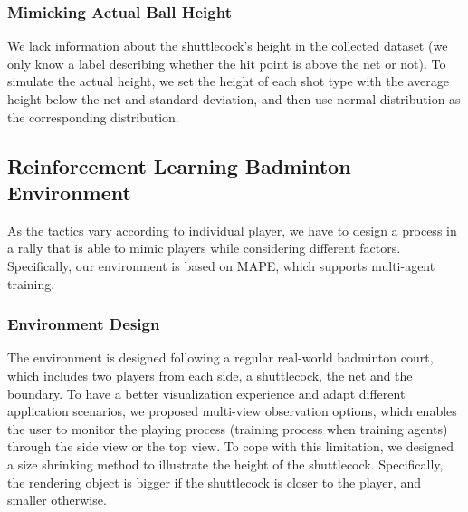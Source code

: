\documentclass[letterpaper]{article} %
\begin{document}
\subsubsection{Mimicking Actual Ball Height}
We lack information about the shuttlecock's height in the collected dataset (we only know a label describing whether the hit point is above the net or not).
To simulate the actual height, we set the height of each shot type with the average height below the net and standard deviation, and then use normal distribution as the corresponding distribution.

\subsection{Reinforcement Learning Badminton Environment}
As the tactics vary according to individual player, we have to design a process in a rally that is able to mimic players while considering different factors.
Specifically, our environment is based on MAPE, which supports multi-agent training.

\subsubsection{Environment Design}
The environment is designed following a regular real-world badminton court, which includes two players from each side, a shuttlecock, the net and the boundary.
To have a better visualization experience and adapt different application scenarios, we proposed multi-view observation options, which enables the user to monitor the playing process (training process when training agents) through the side view or the top view.
To cope with this limitation, we designed a size shrinking method to illustrate the height of the shuttlecock.
Specifically, the rendering object is bigger if the shuttlecock is closer to the player, and smaller otherwise.
\end{document}

